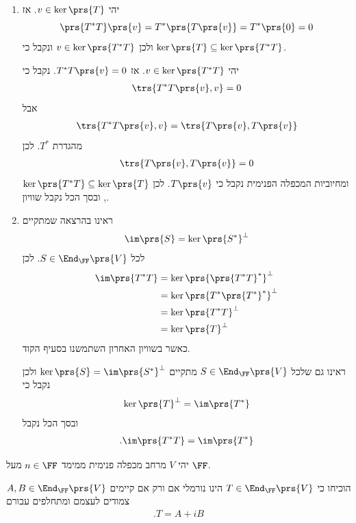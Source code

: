 \documentclass[a4paper,10pt,twoside,openany]{book}
\begin{document}
\begin{solution}
\begin{enumerate}
\item יהי
$v \in \ker\prs{T}$.
אז
\[\prs{T^* T}\prs{v} = T^*\prs{T\prs{v}} = T^*\prs{0} = 0\]
ולכן
$v \in \ker\prs{T^* T}$
ונקבל כי
$\ker\prs{T} \subseteq \ker\prs{T^* T}$.

יהי
$v \in \ker\prs{T^* T}$.
אז
$T^*T\prs{v} = 0$.
נקבל כי
\begin{align*}
\trs{T^* T\prs{v}, v} = 0
\end{align*}
אבל
\begin{align*}
\trs{T^* T \prs{v}, v} = \trs{T\prs{v}, T\prs{v}}
\end{align*}
מהגדרת
$T^*$.
לכן
\begin{align*}
\trs{T\prs{v}, T\prs{v}} = 0
\end{align*}
ומחיוביות המכפלה הפנימית נקבל כי
$T\prs{v}$.
לכן
$\ker\prs{T^* T} \subseteq \ker\prs{T}$,
ובסך הכל נקבל שוויון.

\item ראינו בהרצאה שמתקיים
\begin{align*}
\im\prs{S} = \ker\prs{S^*}^\perp
\end{align*}
לכל
$S \in \End_\FF\prs{V}$.
לכן
\begin{align*}
\im\prs{T^* T} &= \ker\prs{\prs{T^* T}^*}^\perp
\\&=
\ker\prs{T^* \prs{T^*}^*}^\perp
\\&=
\ker\prs{T^* T}^\perp
\\&=
\ker\prs{T}^\perp
\end{align*}
כאשר בשוויון האחרון השתמשנו בסעיף הקוד.


ראינו גם שלכל
$S \in \End_\FF\prs{V}$
מתקיים
$\ker\prs{S} = \im\prs{S^*}^\perp$
ולכן נקבל כי
\begin{align*}
\ker\prs{T}^\perp = \im\prs{T^*}
\end{align*}
ובסך הכל נקבל
\begin{align*}
\text{.} \im\prs{T^* T} = \im\prs{T^*}
\end{align*}
\end{enumerate}
\end{solution}

\begin{exercisechap}
יהי
$V$
מרחב מכפלה פנימית ממימד
$n \in \FF$
מעל
$\FF$.

הוכיחו כי
$T \in \End_\FF\prs{V}$
הינו נורמלי אם ורק אם קיימים
$A,B \in \End_\FF\prs{V}$
צמודים לעצמם ומתחלפים עבורם
\begin{align*}
\text{.} T = A + iB
\end{align*}
\end{exercisechap}
\end{document}
